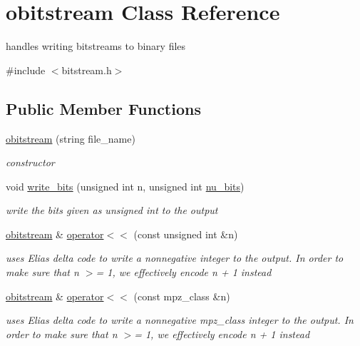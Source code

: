 \hypertarget{classobitstream}{}\section{obitstream Class Reference}
\label{classobitstream}


handles writing bitstreams to binary files  




{\ttfamily \#include $<$bitstream.\+h$>$}

\subsection*{Public Member Functions}
\begin{DoxyCompactItemize}
\item 
\hyperlink{classobitstream_a99e4f20344a99c1e8d892eb0c28b3daa}{obitstream} (string file\+\_\+name)
\begin{DoxyCompactList}\small\item\em constructor \end{DoxyCompactList}\item 
void \hyperlink{classobitstream_afb0cc2fb4f739881436d887bd4770355}{write\+\_\+bits} (unsigned int n, unsigned int \hyperlink{bitstream_8h_a9dfce6f51e3febb3973aa3b16c2fecb4}{nu\+\_\+bits})
\begin{DoxyCompactList}\small\item\em write the bits given as unsigned int to the output \end{DoxyCompactList}\item 
\hyperlink{classobitstream}{obitstream} \& \hyperlink{classobitstream_a09352e38c7d1d5bcff438c0b8ba41ff4}{operator$<$$<$} (const unsigned int \&n)
\begin{DoxyCompactList}\small\item\em uses Elias delta code to write a nonnegative integer to the output. In order to make sure that n $>$= 1, we effectively encode n + 1 instead \end{DoxyCompactList}\item 
\hyperlink{classobitstream}{obitstream} \& \hyperlink{classobitstream_aed715e98e8b47e19e465da1445372229}{operator$<$$<$} (const mpz\+\_\+class \&n)
\begin{DoxyCompactList}\small\item\em uses Elias delta code to write a nonnegative mpz\+\_\+class integer to the output. In order to make sure that n $>$= 1, we effectively encode n + 1 instead \end{DoxyCompactList}\item 

\end{DoxyCompactItemize}
